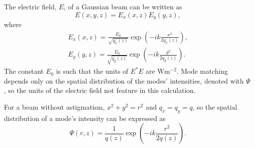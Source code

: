 The electric field, $E$, of a Gaussian beam can be written as
\begin{equation}
E(x,y,z) = E_x(x,z)E_y(y,z),
\end{equation}
where 
\begin{align}
E_x(x,z) = \frac{E_0}{\sqrt{q_x(z)}}\exp\left(-ik\frac{x^2}{2q_x(z)}\right),\\
E_y(y,z) = \frac{E_0}{\sqrt{q_y(z)}}\exp\left(-ik\frac{y^2}{2q_y(z)}\right).
\end{align}
The constant $E_0$ is such that the units of $E^*E$ are $\si{\watt\metre^{-2}}$. Mode matching depends only on the spatial distribution of the modes' intensities, denoted with $\Psi$, so the units of the electric field not feature in this calculation.
\par
For a beam without astigmatism, $x^2 + y^2 = r^2$ and $q_x = q_y = q$, so the spatial distribution of a mode's intensity can be expressed as
\begin{equation}
\Psi(r,z) = \frac{1}{q(z)}\exp\left(-ik\frac{r^2}{2q(z)}\right).
\end{equation}
